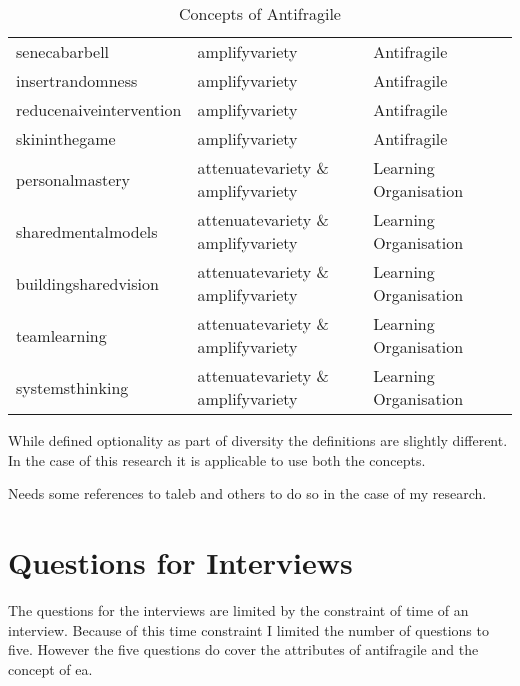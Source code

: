 \begin{table}[!h]
\begin{center}
{\begin{tabular}{@{}llll@{}}
			\Gls{senecabarbell} & \Gls{amplifyvariety} & Antifragile & \parencite{Taleb2012,Botjes2020} \\
			\Gls{insertrandomness} & \Gls{amplifyvariety} & Antifragile & \parencite{Taleb2012,Botjes2020} \\			
			\Gls{reducenaiveintervention} & \Gls{amplifyvariety} & Antifragile & \parencite{Taleb2012,Botjes2020} \\
			\Gls{skininthegame} & \Gls{amplifyvariety} & Antifragile & \parencite{Taleb2012,Botjes2020} \\
			\Gls{personalmastery} & \Gls{attenuatevariety} \& \Gls{amplifyvariety} & Learning Organisation & \parencite{Botjes2020} \\
			\Gls{sharedmentalmodels} & \Gls{attenuatevariety} \& \Gls{amplifyvariety} & Learning Organisation & \parencite{Botjes2020} \\
			\Gls{buildingsharedvision} & \Gls{attenuatevariety} \& \Gls{amplifyvariety} & Learning Organisation & \parencite{Botjes2020} \\
			\Gls{teamlearning} & \Gls{attenuatevariety} \& \Gls{amplifyvariety} & Learning Organisation & \parencite{Botjes2020} \\
			\Gls{systemsthinking} & \Gls{attenuatevariety} \& \Gls{amplifyvariety} & Learning Organisation & \parencite{Botjes2020} \\
			\bottomrule
		\end{tabular}
		}
		\caption{Concepts of Antifragile}
	\end{center}
\end{table}

While \parencite[p. 66]{Botjes2020} defined optionality as part of diversity the definitions are slightly different. In the case of this research it is applicable to use both the concepts.
\begin{remark}
Needs some references to taleb and others to do so in the case of my research.
\end{remark}

\section{Questions for Interviews}
\label{sec:questionsforinterviews}
The questions for the interviews are limited by the constraint of time of an interview. Because of this time constraint I limited the number of questions to five. However the five questions do cover the attributes of \gls{antifragile} and the concept of \gls{ea}.


